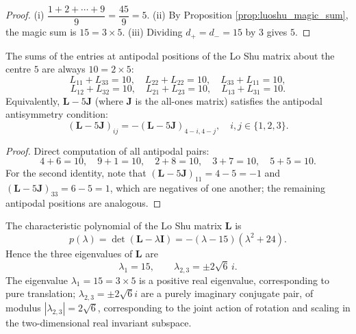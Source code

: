 \begin{proof}
(i) $\dfrac{1 + 2 + \cdots + 9}{9} = \dfrac{45}{9} = 5$.
(ii) By Proposition \ref{prop:luoshu_magic_sum}, the magic sum is $15 = 3 \times 5$.
(iii) Dividing $d_+ = d_- = 15$ by $3$ gives $5$.
\end{proof}

\begin{proposition}\label{prop:luoshu_antipodal}
The sums of the entries at antipodal positions of the Lo Shu matrix about the centre $5$ are always $10 = 2 \times 5$:
\[
L_{11} + L_{33} = 10, \quad L_{22} + L_{22} = 10, \quad L_{33} + L_{11} = 10,
\]
\[
L_{12} + L_{32} = 10, \quad L_{21} + L_{23} = 10, \quad L_{13} + L_{31} = 10.
\]
Equivalently, $\mathbf{L} - 5\mathbf{J}$ (where $\mathbf{J}$ is the all-ones matrix) satisfies the antipodal antisymmetry condition:
\[
(\mathbf{L} - 5\mathbf{J})_{ij} = -(\mathbf{L} - 5\mathbf{J})_{4-i, 4-j}, \quad i, j \in \{1, 2, 3\}.
\]
\end{proposition}

\begin{proof}
Direct computation of all antipodal pairs:
\[
4 + 6 = 10, \quad 9 + 1 = 10, \quad 2 + 8 = 10, \quad 3 + 7 = 10, \quad 5 + 5 = 10.
\]
For the second identity, note that $(\mathbf{L} - 5\mathbf{J})_{11} = 4 - 5 = -1$ and $(\mathbf{L} - 5\mathbf{J})_{33} = 6 - 5 = 1$, which are negatives of one another; the remaining antipodal positions are analogous.
\end{proof}

\begin{theorem}\label{thm:luoshu_eigenvalues}
The characteristic polynomial of the Lo Shu matrix $\mathbf{L}$ is
\[
p(\lambda) = \det(\mathbf{L} - \lambda \mathbf{I}) = -(\lambda - 15)(\lambda^2 + 24).
\]
Hence the three eigenvalues of $\mathbf{L}$ are
\[
\lambda_1 = 15, \qquad \lambda_{2,3} = \pm 2\sqrt{6}\, i.
\]
The eigenvalue $\lambda_1 = 15 = 3 \times 5$ is a positive real eigenvalue, corresponding to pure translation; $\lambda_{2,3} = \pm 2\sqrt{6} i$ are a purely imaginary conjugate pair, of modulus $|\lambda_{2,3}| = 2\sqrt{6}$, corresponding to the joint action of rotation and scaling in the two-dimensional real invariant subspace.
\end{theorem}

